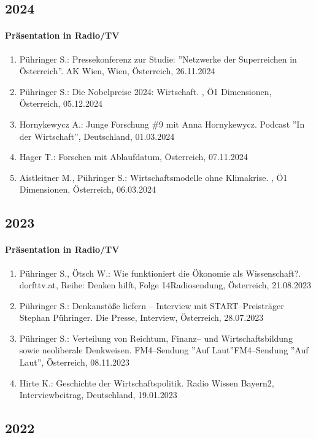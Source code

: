 \subsection*{2024}
\paragraph{Präsentation in Radio/TV}
\begin{enumerate}
	\item Pühringer S.: Pressekonferenz zur Studie: ''Netzwerke der Superreichen in Österreich''. AK Wien, Wien, Österreich, 26.11.2024
	\item Pühringer S.: Die Nobelpreise 2024: Wirtschaft. , Ö1 Dimensionen, Österreich, 05.12.2024
	\item Hornykewycz A.: Junge Forschung \#9 mit Anna Hornykewycz. Podcast ''In der Wirtschaft'', Deutschland, 01.03.2024
	\item Hager T.: Forschen mit Ablaufdatum, Österreich, 07.11.2024
	\item Aistleitner M., Pühringer S.: Wirtschaftsmodelle ohne Klimakrise. , Ö1 Dimensionen, Österreich, 06.03.2024
\end{enumerate}
\subsection*{2023}
\paragraph{Präsentation in Radio/TV}
\begin{enumerate}
	\item Pühringer S., Ötsch W.: Wie funktioniert die Ökonomie als Wissenschaft?. dorfttv.at, Reihe: Denken hilft, Folge 14Radiosendung, Österreich, 21.08.2023
	\item Pühringer S.: Denkanstöße liefern -- Interview mit START--Preisträger Stephan Pühringer. Die Presse, Interview, Österreich, 28.07.2023
	\item Pühringer S.: Verteilung von Reichtum, Finanz-- und Wirtschaftsbildung sowie neoliberale Denkweisen. FM4--Sendung ''Auf Laut''FM4--Sendung ''Auf Laut'', Österreich, 08.11.2023
	\item Hirte K.: Geschichte der Wirtschaftspolitik. Radio Wissen Bayern2, Interviewbeitrag, Deutschland, 19.01.2023
\end{enumerate}
\subsection*{2022}
